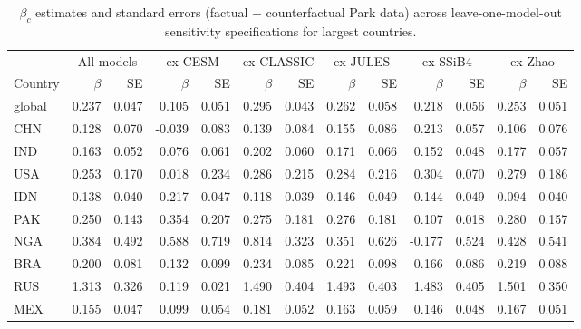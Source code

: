 \begin{table}[ht]
\centering
\caption{$\beta_c$ estimates and standard errors (factual + counterfactual Park data) across leave-one-model-out sensitivity specifications for largest countries.} 
\label{tab:beta_select_fact_cfact}
\begin{tabular}{lrrrrrrrrrrrr}
  \toprule
   & \multicolumn{2}{c}{All models} & \multicolumn{2}{c}{ex CESM} & \multicolumn{2}{c}{ex CLASSIC} & \multicolumn{2}{c}{ex JULES} & \multicolumn{2}{c}{ex SSiB4} & \multicolumn{2}{c}{ex Zhao} \\
\cmidrule(lr){2-3}\cmidrule(lr){4-5}\cmidrule(lr){6-7}\cmidrule(lr){8-9}\cmidrule(lr){10-11}\cmidrule(lr){12-13}
Country & $\beta$ & SE & $\beta$ & SE & $\beta$ & SE & $\beta$ & SE & $\beta$ & SE & $\beta$ & SE \\
\midrule
 \midrule
global & 0.237 & 0.047 & 0.105 & 0.051 & 0.295 & 0.043 & 0.262 & 0.058 & 0.218 & 0.056 & 0.253 & 0.051 \\ 
  CHN & 0.128 & 0.070 & -0.039 & 0.083 & 0.139 & 0.084 & 0.155 & 0.086 & 0.213 & 0.057 & 0.106 & 0.076 \\ 
  IND & 0.163 & 0.052 & 0.076 & 0.061 & 0.202 & 0.060 & 0.171 & 0.066 & 0.152 & 0.048 & 0.177 & 0.057 \\ 
  USA & 0.253 & 0.170 & 0.018 & 0.234 & 0.286 & 0.215 & 0.284 & 0.216 & 0.304 & 0.070 & 0.279 & 0.186 \\ 
  IDN & 0.138 & 0.040 & 0.217 & 0.047 & 0.118 & 0.039 & 0.146 & 0.049 & 0.144 & 0.049 & 0.094 & 0.040 \\ 
  PAK & 0.250 & 0.143 & 0.354 & 0.207 & 0.275 & 0.181 & 0.276 & 0.181 & 0.107 & 0.018 & 0.280 & 0.157 \\ 
  NGA & 0.384 & 0.492 & 0.588 & 0.719 & 0.814 & 0.323 & 0.351 & 0.626 & -0.177 & 0.524 & 0.428 & 0.541 \\ 
  BRA & 0.200 & 0.081 & 0.132 & 0.099 & 0.234 & 0.085 & 0.221 & 0.098 & 0.166 & 0.086 & 0.219 & 0.088 \\ 
  RUS & 1.313 & 0.326 & 0.119 & 0.021 & 1.490 & 0.404 & 1.493 & 0.403 & 1.483 & 0.405 & 1.501 & 0.350 \\ 
  MEX & 0.155 & 0.047 & 0.099 & 0.054 & 0.181 & 0.052 & 0.163 & 0.059 & 0.146 & 0.048 & 0.167 & 0.051 \\ 
   \bottomrule
\end{tabular}
\end{table}
